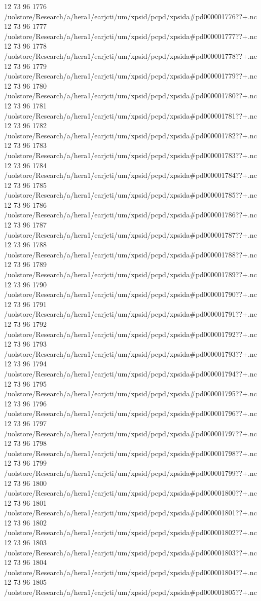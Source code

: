 12 73 96
1776
/uolstore/Research/a/hera1/earjcti/um/xpsid/pcpd/xpsida#pd000001776??+.nc
12 73 96
1777
/uolstore/Research/a/hera1/earjcti/um/xpsid/pcpd/xpsida#pd000001777??+.nc
12 73 96
1778
/uolstore/Research/a/hera1/earjcti/um/xpsid/pcpd/xpsida#pd000001778??+.nc
12 73 96
1779
/uolstore/Research/a/hera1/earjcti/um/xpsid/pcpd/xpsida#pd000001779??+.nc
12 73 96
1780
/uolstore/Research/a/hera1/earjcti/um/xpsid/pcpd/xpsida#pd000001780??+.nc
12 73 96
1781
/uolstore/Research/a/hera1/earjcti/um/xpsid/pcpd/xpsida#pd000001781??+.nc
12 73 96
1782
/uolstore/Research/a/hera1/earjcti/um/xpsid/pcpd/xpsida#pd000001782??+.nc
12 73 96
1783
/uolstore/Research/a/hera1/earjcti/um/xpsid/pcpd/xpsida#pd000001783??+.nc
12 73 96
1784
/uolstore/Research/a/hera1/earjcti/um/xpsid/pcpd/xpsida#pd000001784??+.nc
12 73 96
1785
/uolstore/Research/a/hera1/earjcti/um/xpsid/pcpd/xpsida#pd000001785??+.nc
12 73 96
1786
/uolstore/Research/a/hera1/earjcti/um/xpsid/pcpd/xpsida#pd000001786??+.nc
12 73 96
1787
/uolstore/Research/a/hera1/earjcti/um/xpsid/pcpd/xpsida#pd000001787??+.nc
12 73 96
1788
/uolstore/Research/a/hera1/earjcti/um/xpsid/pcpd/xpsida#pd000001788??+.nc
12 73 96
1789
/uolstore/Research/a/hera1/earjcti/um/xpsid/pcpd/xpsida#pd000001789??+.nc
12 73 96
1790
/uolstore/Research/a/hera1/earjcti/um/xpsid/pcpd/xpsida#pd000001790??+.nc
12 73 96
1791
/uolstore/Research/a/hera1/earjcti/um/xpsid/pcpd/xpsida#pd000001791??+.nc
12 73 96
1792
/uolstore/Research/a/hera1/earjcti/um/xpsid/pcpd/xpsida#pd000001792??+.nc
12 73 96
1793
/uolstore/Research/a/hera1/earjcti/um/xpsid/pcpd/xpsida#pd000001793??+.nc
12 73 96
1794
/uolstore/Research/a/hera1/earjcti/um/xpsid/pcpd/xpsida#pd000001794??+.nc
12 73 96
1795
/uolstore/Research/a/hera1/earjcti/um/xpsid/pcpd/xpsida#pd000001795??+.nc
12 73 96
1796
/uolstore/Research/a/hera1/earjcti/um/xpsid/pcpd/xpsida#pd000001796??+.nc
12 73 96
1797
/uolstore/Research/a/hera1/earjcti/um/xpsid/pcpd/xpsida#pd000001797??+.nc
12 73 96
1798
/uolstore/Research/a/hera1/earjcti/um/xpsid/pcpd/xpsida#pd000001798??+.nc
12 73 96
1799
/uolstore/Research/a/hera1/earjcti/um/xpsid/pcpd/xpsida#pd000001799??+.nc
12 73 96
1800
/uolstore/Research/a/hera1/earjcti/um/xpsid/pcpd/xpsida#pd000001800??+.nc
12 73 96
1801
/uolstore/Research/a/hera1/earjcti/um/xpsid/pcpd/xpsida#pd000001801??+.nc
12 73 96
1802
/uolstore/Research/a/hera1/earjcti/um/xpsid/pcpd/xpsida#pd000001802??+.nc
12 73 96
1803
/uolstore/Research/a/hera1/earjcti/um/xpsid/pcpd/xpsida#pd000001803??+.nc
12 73 96
1804
/uolstore/Research/a/hera1/earjcti/um/xpsid/pcpd/xpsida#pd000001804??+.nc
12 73 96
1805
/uolstore/Research/a/hera1/earjcti/um/xpsid/pcpd/xpsida#pd000001805??+.nc
